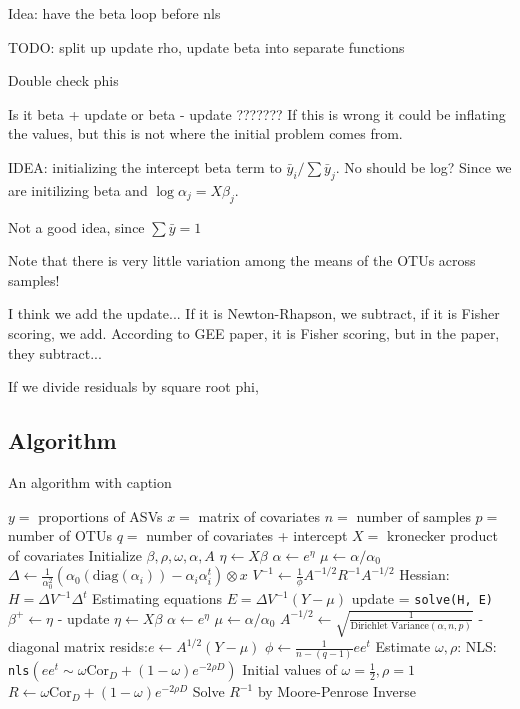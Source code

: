 \documentclass[10pt]{article}
\begin{document}
Idea: have the beta loop before nls

TODO: split up update rho, update beta into separate functions

Double check phis

Is it beta + update or beta - update ???????
If this is wrong it could be inflating the values, but this is not where the initial problem comes from.



IDEA: initializing the intercept beta term to $\bar y_i/\sum \bar y_j$. No should be log? Since we are initilizing beta and $\log \alpha_j = X \beta_j$.

Not a good idea, since $\sum \bar y = 1$

Note that there is very little variation among the means of the OTUs across samples!

I think we add the update...
If it is Newton-Rhapson, we subtract, if it is Fisher scoring, we add.
According to GEE paper, it is Fisher scoring, but in the paper, they subtract...


If we divide residuals by square root phi,

\subsection*{Algorithm}

\begin{algorithm}
\caption{An algorithm with caption}\label{alg:cap}
\begin{algorithmic}
\State $y = $ proportions of ASVs
\State $x = $ matrix of covariates
\State $n = $ number of samples
\State $p = $ number of OTUs
\State $q = $ number of covariates + intercept
\State $X = $ kronecker product of covariates
\State Initialize $\beta, \rho, \omega, \alpha, A$
\Loop
  \Loop
  \State $\eta \gets X \beta$
  \State $\alpha \gets e^\eta$
  \State $\mu \gets \alpha/\alpha_0$
  \State $\Delta \gets \frac{1}{\alpha_0^2} ( \alpha_0(\text{diag}(\alpha_i)) - \alpha_i \alpha_i^t ) \otimes x $
  \State $V^{-1} \gets \frac{1}{\phi} A^{-1/2} R^{-1} A^{-1/2}$
  \State Hessian: $H = \Delta V ^{-1} \Delta^t$
  \State Estimating equations $E = \Delta V ^{-1}(Y - \mu)$
  \State update = \texttt{solve(H, E)}
  \State $\beta^+ \gets \eta$ - update
  \EndLoop
  \State $\eta \gets X \beta$
  \State $\alpha \gets e^\eta$
  \State $\mu \gets \alpha/\alpha_0$
  \State $A^{-1/2} \gets \sqrt{\frac{1}{\text{Dirichlet Variance}(\alpha,n,p)}}$ - diagonal matrix
  \State resids:$e \gets A^{1/2}(Y - \mu)$
  \State $\phi \gets \frac{1}{n-(q-1)} e e^t$
  \State Estimate $\omega, \rho$: NLS: \texttt{nls}$(e e^t \sim \omega \text{Cor}_D + (1 - \omega)e^{-2\rho D})$
  Initial values of $\omega = \tfrac{1}{2}, \rho = 1$
  \State $R \gets \omega\text{Cor}_D + (1 - \omega)e^{-2\rho D}$
  \State Solve $R ^{-1} $ by Moore-Penrose Inverse

\EndLoop
\end{algorithmic}
\end{algorithm}
\end{document}
